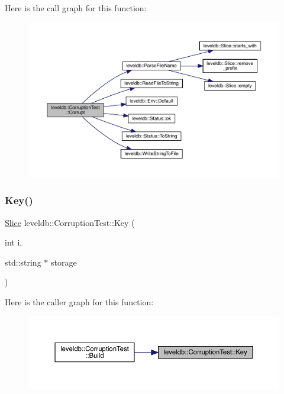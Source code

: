 Here is the call graph for this function\+:
\nopagebreak
\begin{figure}[H]
\begin{center}
\leavevmode
\includegraphics[width=350pt]{classleveldb_1_1_corruption_test_a22060ac0a3697640cdcf36973339b646_cgraph}
\end{center}
\end{figure}
\mbox{\label{classleveldb_1_1_corruption_test_a157c0095fca3c0a2ccaf3b8647705469}} 
\subsubsection{\texorpdfstring{Key()}{Key()}}
{\footnotesize\ttfamily \mbox{\hyperlink{classleveldb_1_1_slice}{Slice}} leveldb\+::\+Corruption\+Test\+::\+Key (\begin{DoxyParamCaption}\item[{int}]{i,  }\item[{std\+::string $\ast$}]{storage }\end{DoxyParamCaption})\hspace{0.3cm}{\ttfamily [inline]}}

Here is the caller graph for this function\+:
\nopagebreak
\begin{figure}[H]
\begin{center}
\leavevmode
\includegraphics[width=350pt]{classleveldb_1_1_corruption_test_a157c0095fca3c0a2ccaf3b8647705469_icgraph}
\end{center}
\end{figure}
\mbox{\label{classleveldb_1_1_corruption_test_aab1ed767d1cdac7e95a32ccf6defc709}} 
